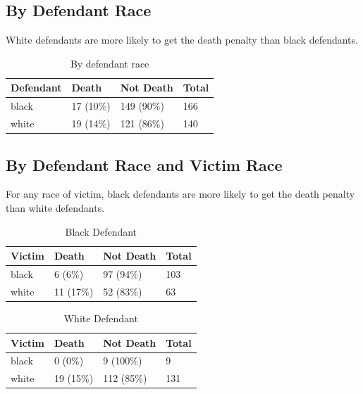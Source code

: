 \documentclass{exam}
\begin{document}
  \subsection{By Defendant Race}

  White defendants are more likely to get the death penalty than black defendants.

  \begin{table}[H]
    \centering
    \begin{tabular}{llll}
      \toprule
      Defendant & Death     & Not Death  & Total \\
      \midrule
      black     & 17 (10\%) & 149 (90\%) & 166 \\
      white     & 19 (14\%) & 121 (86\%) & 140 \\
      \bottomrule
    \end{tabular}
    \caption{By defendant race}
  \end{table}

  \subsection{By Defendant Race and Victim Race}

  For any race of victim, black defendants are more likely to get the death penalty than white defendants.

  \begin{table}[H]
    \centering
    \begin{tabular}{llll}
      \toprule
      Victim & Death     & Not Death & Total \\
      \midrule
      black  & 6 (6\%)   & 97 (94\%) & 103 \\
      white  & 11 (17\%) & 52 (83\%) & 63 \\
      \bottomrule
    \end{tabular}
    \caption{Black Defendant}
  \end{table}

  \begin{table}[H]
    \centering
    \begin{tabular}{llll}
      \toprule
      Victim & Death     & Not Death  & Total \\
      \midrule
      black  & 0 (0\%)   & 9 (100\%)  & 9 \\
      white  & 19 (15\%) & 112 (85\%) & 131 \\
      \bottomrule
    \end{tabular}
    \caption{White Defendant}
  \end{table}
\end{document}
